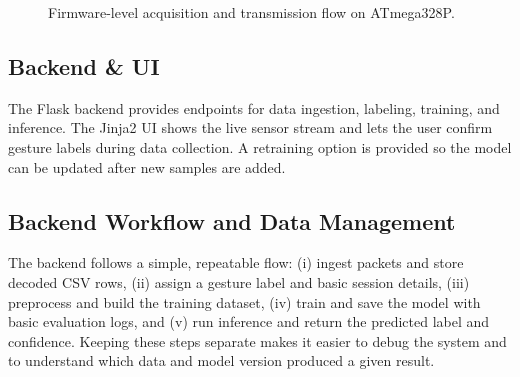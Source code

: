 \documentclass[conference]{IEEEtran}
\begin{document}
\begin{figure}[htbp]
{\begin{minipage}{0.94\linewidth}
    \end{minipage}%
    \vspace*{4mm}%
    }%
    \caption{Firmware-level acquisition and transmission flow on ATmega328P.}
    \label{fig:firmware}
\end{figure}

\subsection{Backend \& UI}
The Flask backend provides endpoints for data ingestion, labeling, training, and inference\cite{flask}. The Jinja2 UI shows the live sensor stream and lets the user confirm gesture labels during data collection. A retraining option is provided so the model can be updated after new samples are added.

\subsection{Backend Workflow and Data Management}
The backend follows a simple, repeatable flow: (i) ingest packets and store decoded CSV rows, (ii) assign a gesture label and basic session details, (iii) preprocess and build the training dataset, (iv) train and save the model with basic evaluation logs, and (v) run inference and return the predicted label and confidence. Keeping these steps separate makes it easier to debug the system and to understand which data and model version produced a given result.
\end{document}
